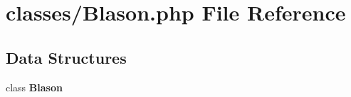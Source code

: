 \section{classes/\+Blason.php File Reference}
\label{_blason_8php}
\subsection*{Data Structures}
\begin{DoxyCompactItemize}
\item 
class \textbf{ Blason}
\end{DoxyCompactItemize}
